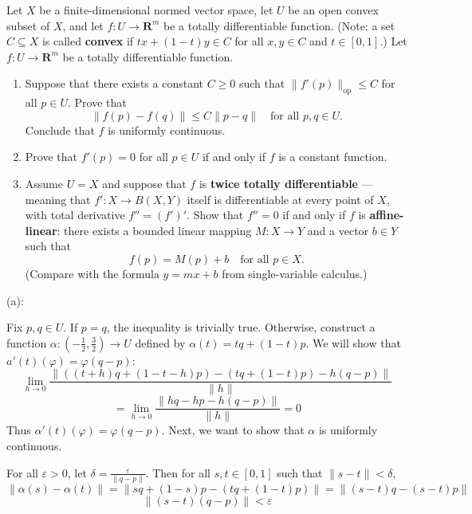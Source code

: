 \documentclass{article}
\newcommand{\R}{\mathbf{R}}
\theoremstyle{plain} %
\numberwithin{thm}{section} %
\theoremstyle{definition}
\begin{document}
    \pagebreak
    \begin{question}{25}
        Let $X$ be a finite-dimensional normed vector space, let $U$ be an open convex subset of $X$, and let $f:U\rightarrow \R^m$ be a totally differentiable function. (Note: a set $C\subseteq X$ is called \textbf{convex} if $tx+(1-t)y\in C$ for all $x,y\in C$ and $t\in [0,1]$.) Let $f:U\rightarrow \R^m$ be a totally differentiable function.

    \begin{enumerate}[label=(\alph*)]
        \item Suppose that there exists a constant $C\geq 0$ such that $\|f'(p)\|_{\mathrm{op}}\leq C$ for all $p\in U$. Prove that
            \[ \|f(p)-f(q)\| \leq C\|p-q\| \quad \text{for all $p,q\in U$.}  \]
        Conclude that $f$ is uniformly continuous.
        
        \item Prove that $f'(p)=0$ for all $p\in U$ if and only if $f$ is a constant function.

        \item Assume $U=X$ and suppose that $f$ is \textbf{twice totally differentiable} --- meaning that $f':X\rightarrow B(X,Y)$ itself is differentiable at every point of $X$, with total derivative $f''=(f')'$. Show that $f''=0$ if and only if $f$ is \textbf{affine-linear}: there exists a bounded linear mapping $M:X\rightarrow Y$ and a vector $b\in Y$ such that
            \[ f(p) = M(p) + b \quad \text{for all $p\in X$.} \]
        (Compare with the formula $y=mx+b$ from single-variable calculus.)
    \end{enumerate}
    \tcblower
    (a):

    Fix \(p,q \in U\). If \(p = q\), the inequality is trivially true. Otherwise, construct a function \(\alpha : (-\frac{1}{2}, \frac{3}{2}) \to U\) defined by \(\alpha (t) = tq + (1-t)p\). We will show that \(a'(t)(\varphi) = \varphi (q-p)\):
    \[
        \lim_{h \to 0} \frac{\|((t+h)q + (1-t-h)p) - (tq + (1-t)p) - h(q-p)\|}{\|h\|}
    \]
    \[
        = \lim_{h \to 0} \frac{\|hq -hp - h(q-p)\|}{\|h\|} = 0
    \]
    Thus \(\alpha '(t)(\varphi) = \varphi (q-p)\). Next, we want to show that \(\alpha\) is uniformly continuous.

    For all \(\varepsilon > 0\), let \(\delta = \frac{\varepsilon}{\|q-p\|}\). Then for all \(s,t \in [0,1]\) such that \(\|s-t\| < \delta \),
    \[
        \| \alpha (s) - \alpha (t) \| = \|s q + (1-s)p - (tq + (1-t)p) \| = \|(s-t)q - (s-t)p\|
    \]
    \[
        \|(s-t)(q-p)\| < \varepsilon
    \]


\end{question}
\end{document}
